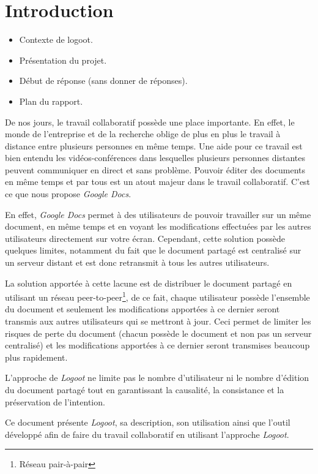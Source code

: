 \chapter*{Introduction}
  \begin{itemize}
    \item Contexte de logoot.
    \item Présentation du projet.
    \item Début de réponse (sans donner de réponses).
    \item Plan du rapport.
  \end{itemize}

De nos jours, le travail collaboratif possède une place importante. En effet, le
monde de l'entreprise et de la recherche oblige de plus en plus le travail à
distance entre plusieurs personnes en même temps. Une aide pour ce travail est
bien entendu les vidéos-conférences dans lesquelles plusieurs personnes
distantes peuvent communiquer en direct et sans problème. Pouvoir éditer des
documents en même temps et par tous est un atout majeur dans le travail
collaboratif. C'est ce que nous propose \emph{Google Docs}.

En effet, \emph{Google Docs} permet à des utilisateurs de pouvoir travailler sur
un même document, en même temps et en voyant les modifications effectuées par
les autres utilisateurs directement sur votre écran. Cependant, cette solution
possède quelques limites, notamment du fait que le document partagé est
centralisé sur un serveur distant et est donc retransmit à tous les autres
utilisateurs.

La solution apportée à cette lacune est de distribuer le document partagé en
utilisant un réseau peer-to-peer\footnote{Réseau pair-à-pair}, de ce
fait, chaque utilisateur possède l'ensemble du document et seulement les
modifications apportées à ce dernier seront transmis aux autres utilisateurs qui
se mettront à jour. Ceci permet de limiter les risques de perte du document
(chacun possède le document et non pas un serveur centralisé) et les
modifications apportées à ce dernier seront transmises beaucoup plus rapidement.

L'approche de \emph{Logoot} ne limite pas le nombre d'utilisateur ni le nombre
d'édition du document partagé tout en garantissant la causalité, la consistance
et la préservation de l'intention.

Ce document présente \emph{Logoot}, sa description, son utilisation ainsi que
l'outil développé afin de faire du travail collaboratif en utilisant l'approche
\emph{Logoot}.
